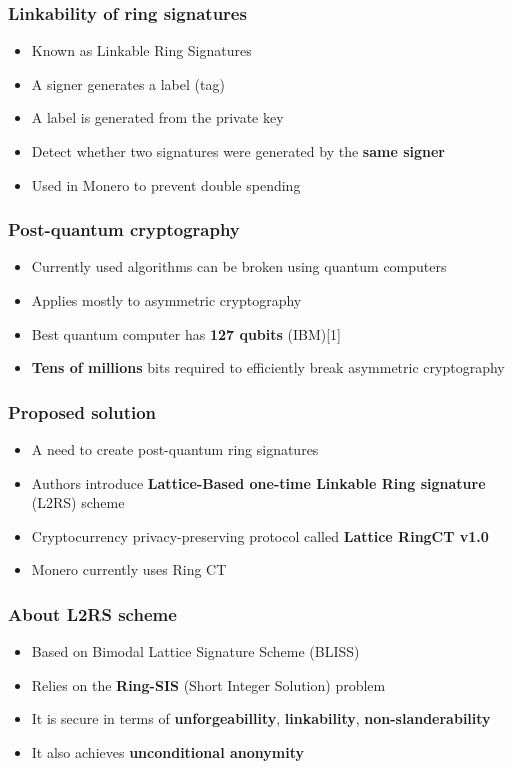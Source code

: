 \documentclass[%
  14pt,       				%
	c,                  %
	aspectratio=1610,   %
	unicode,						%
]{beamer}				    	%
\begin{document}
\begin{frame} 
  \frametitle{Linkability of ring signatures}
  \large{
    \begin{itemize}
      \item Known as Linkable Ring Signatures
      \item A signer generates a label (tag)
      \item A label is generated from the private key
      \item Detect whether two signatures were generated by the \textbf{same signer}
      \item Used in Monero to prevent double spending
    \end{itemize}
  }
\end{frame}

\begin{frame} 
  \frametitle{Post-quantum cryptography}
  \large{
    \begin{itemize}
      \item Currently used algorithms can be broken using quantum computers
      \item Applies mostly to asymmetric cryptography
      \item Best quantum computer has \textbf{127 qubits} (IBM)[1]
      \item \textbf{Tens of millions} bits required to efficiently break asymmetric cryptography
    \end{itemize}
  }
\end{frame}

\begin{frame}
  \frametitle{Proposed solution}
  \large{
    \begin{itemize}
      \item A need to create post-quantum ring signatures
      \item Authors introduce \textbf{Lattice-Based one-time Linkable Ring signature} (L2RS) scheme
      \item Cryptocurrency privacy-preserving protocol called \textbf{Lattice RingCT v1.0}
      \item Monero currently uses Ring CT
    \end{itemize}
  }
\end{frame}

\begin{frame}
  \frametitle{About L2RS scheme}
  \large{
    \begin{itemize}
      \item Based on Bimodal Lattice Signature Scheme (BLISS)
      \item Relies on the \textbf{Ring-SIS} (Short Integer Solution) problem
      \item It is secure in terms of \textbf{unforgeabillity}, \textbf{linkability}, \textbf{non-slanderability} 
      \item It also achieves \textbf{unconditional anonymity}
    \end{itemize}
  }
\end{frame}
\end{document}
